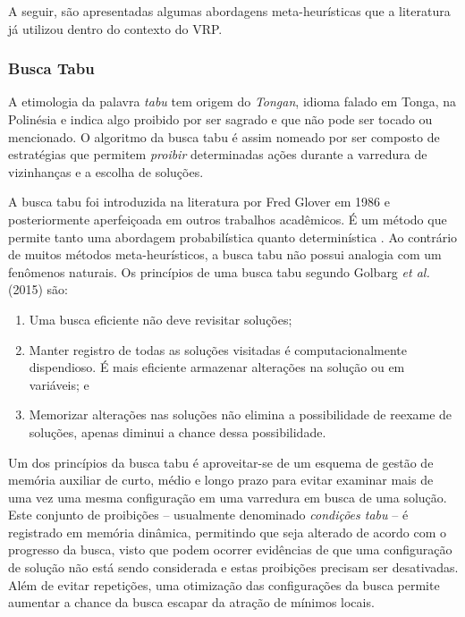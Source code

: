 A seguir, são apresentadas algumas abordagens meta-heurísticas que a literatura já utilizou dentro do contexto do VRP.


\subsubsection{Busca Tabu}

A etimologia da palavra \emph{tabu} tem origem do \emph{Tongan}, idioma falado em Tonga, na Polinésia e indica algo proibido por ser sagrado e que não pode ser tocado ou mencionado. O algoritmo da busca tabu é assim nomeado por ser composto de estratégias que permitem \emph{proibir} determinadas ações durante a varredura de vizinhanças e a escolha de soluções.

A busca tabu foi introduzida na literatura por Fred Glover em 1986 \cite{GLOVER1986533} e posteriormente aperfeiçoada em outros trabalhos acadêmicos. É um método que permite tanto uma abordagem probabilística \cite{crainic1993dynamic} quanto determinística \cite{ongsakul2004unit}. Ao contrário de muitos métodos meta-heurísticos, a busca tabu não possui analogia com um fenômenos naturais. Os princípios de uma busca tabu segundo Golbarg \emph{et al.} (2015) são:
\begin{enumerate}
    \item Uma busca eficiente não deve revisitar soluções;
    \item Manter registro de todas as soluções visitadas é computacionalmente dispendioso. É mais eficiente armazenar alterações na solução ou em variáveis; e
    \item Memorizar alterações nas soluções não elimina a possibilidade de reexame de soluções, apenas diminui a chance dessa possibilidade.
\end{enumerate}

Um dos princípios da busca tabu é aproveitar-se de um esquema de gestão de memória auxiliar de curto, médio e longo prazo para evitar examinar mais de uma vez uma mesma configuração em uma varredura em busca de uma solução. Este conjunto de proibições -- usualmente denominado \emph{condições tabu} -- é registrado em memória dinâmica, permitindo que seja alterado de acordo com o progresso da busca, visto que podem ocorrer evidências de que uma configuração de solução não está sendo considerada e estas proibições precisam ser desativadas. Além de evitar repetições, uma otimização das configurações da busca permite aumentar a chance da busca escapar da atração de mínimos locais. 


